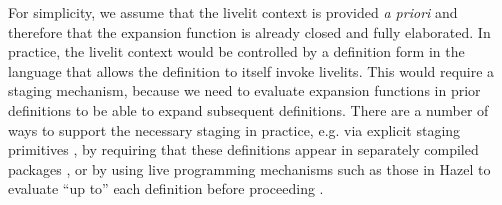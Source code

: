 For simplicity, we assume that the livelit context is provided \emph{a priori} and therefore
that the expansion function is already closed and fully elaborated.
In practice, the livelit context would be controlled by a definition form in the language
that allows the definition to itself invoke livelits.
This would require a staging mechanism,
because we need to evaluate expansion functions in prior definitions to be able to
expand subsequent definitions.
There are a number of ways to support the necessary staging in practice, e.g.
via explicit staging primitives \cite{DBLP:conf/icfp/Flatt02},
by requiring that these definitions appear in separately compiled packages \cite{TLMs},
or by using live
programming mechanisms such as those in Hazel
to evaluate ``up to'' each definition before proceeding \cite{HazelnutLive}.

